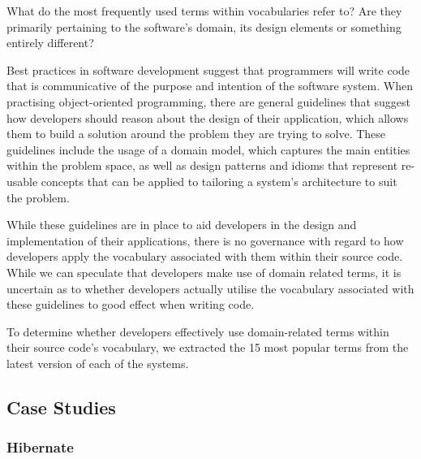 What do the most frequently used terms within vocabularies refer to? Are they primarily pertaining to the software's domain, its design elements or something entirely different?

Best practices in software development suggest that programmers will write code that is communicative of the purpose and intention of the software system. When practising object-oriented programming, there are general guidelines that suggest how developers should reason about the design of their application, which allows them to build a solution around the problem they are trying to solve. These guidelines include the usage of a domain model, which captures the main entities within the problem space, as well as design patterns and idioms that represent re-usable concepts that can be applied to tailoring a system's architecture to suit the problem.

While these guidelines are in place to aid developers in the design and implementation of their applications, there is no governance with regard to how developers apply the vocabulary associated with them within their source code. While we can speculate that developers make use of domain related terms, it is uncertain as to whether developers actually utilise the vocabulary associated with these guidelines to good effect when writing code.

To determine whether developers effectively use domain-related terms within their source code's vocabulary, we extracted the 15 most popular terms from the latest version of each of the systems.

\subsection{Case Studies} %
\label{sub:case_studies}

\subsubsection{Hibernate} %
\label{ssub:hibernate}


